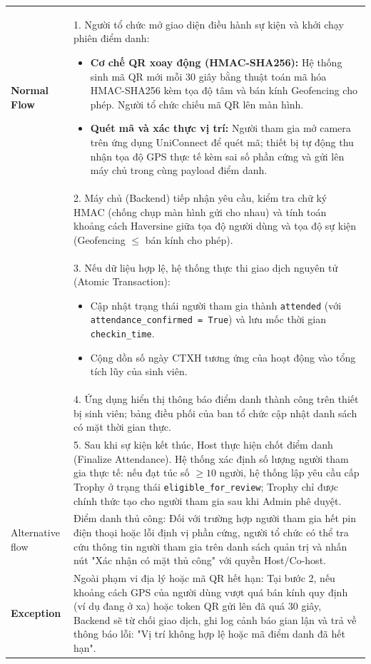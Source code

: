 \begin{xltabular}{\textwidth}{|>{\bfseries}p{3.5cm}|X|}
    \textbf{Normal Flow} & 1. Người tổ chức mở giao diện điều hành sự kiện và khởi chạy phiên điểm danh:
    \vspace{0.2cm}
    \begin{itemize}[leftmargin=*, noitemsep]
        \item \textbf{Cơ chế QR xoay động (HMAC-SHA256):} Hệ thống sinh mã QR mới mỗi 30 giây bằng thuật toán mã hóa HMAC-SHA256 kèm tọa độ tâm và bán kính Geofencing cho phép. Người tổ chức chiếu mã QR lên màn hình.
        \item \textbf{Quét mã và xác thực vị trí:} Người tham gia mở camera trên ứng dụng UniConnect để quét mã; thiết bị tự động thu nhận tọa độ GPS thực tế kèm sai số phần cứng và gửi lên máy chủ trong cùng payload điểm danh.
    \end{itemize} \\ 
    & 2. Máy chủ (Backend) tiếp nhận yêu cầu, kiểm tra chữ ký HMAC (chống chụp màn hình gửi cho nhau) và tính toán khoảng cách Haversine giữa tọa độ người dùng và tọa độ sự kiện (Geofencing $\le$ bán kính cho phép). \\ 
    & 3. Nếu dữ liệu hợp lệ, hệ thống thực thi giao dịch nguyên tử (Atomic Transaction):
    \begin{itemize}[leftmargin=*, noitemsep]
        \item Cập nhật trạng thái người tham gia thành \texttt{attended} (với \texttt{attendance\_confirmed = True}) và lưu mốc thời gian \texttt{checkin\_time}.
        \item Cộng dồn số ngày CTXH tương ứng của hoạt động vào tổng tích lũy của sinh viên.
    \end{itemize} \\ 
    & 4. Ứng dụng hiển thị thông báo điểm danh thành công trên thiết bị sinh viên; bảng điều phối của ban tổ chức cập nhật danh sách có mặt thời gian thực. \\ 
    & 5. Sau khi sự kiện kết thúc, Host thực hiện chốt điểm danh (Finalize Attendance). Hệ thống xác định số lượng người tham gia thực tế: nếu đạt túc số $\ge 10$ người, hệ thống lập yêu cầu cấp Trophy ở trạng thái \texttt{eligible\_for\_review}; Trophy chỉ được chính thức tạo cho người tham gia sau khi Admin phê duyệt. \\ \hline
    
    Alternative flow & Điểm danh thủ công: Đối với trường hợp người tham gia hết pin điện thoại hoặc lỗi định vị phần cứng, người tổ chức có thể tra cứu thông tin người tham gia trên danh sách quản trị và nhấn nút "Xác nhận có mặt thủ công" với quyền Host/Co-host. \\ \hline
    Exception & Ngoài phạm vi địa lý hoặc mã QR hết hạn: Tại bước 2, nếu khoảng cách GPS của người dùng vượt quá bán kính quy định (ví dụ đang ở xa) hoặc token QR gửi lên đã quá 30 giây, Backend sẽ từ chối giao dịch, ghi log cảnh báo gian lận và trả về thông báo lỗi: "Vị trí không hợp lệ hoặc mã điểm danh đã hết hạn". \\ \hline

\end{xltabular}

